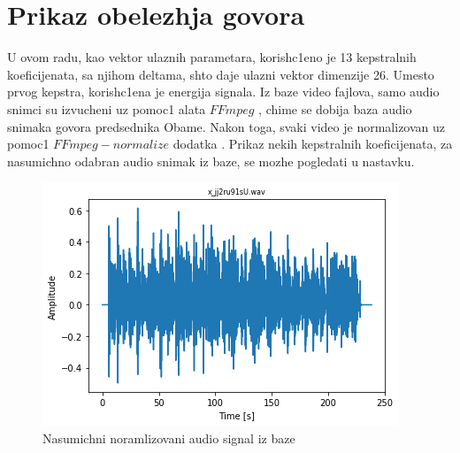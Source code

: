 \documentclass[a4paper, openany, oneside, 11pt]{book}
\begin{document}
\section{Prikaz obelezhja govora}
U ovom radu, kao vektor ulaznih parametara, korish\-c1eno je 13 kepstralnih koeficijenata, sa njihom deltama, shto daje ulazni vektor dimenzije 26. Umesto prvog kepstra, korish\-c1ena je energija signala. Iz baze video fajlova, samo audio snimci su izvucheni uz pomoc1 alata $FFmpeg$ \cite{FFmpeg}, chime se dobija baza audio snimaka govora predsednika Obame. Nakon toga, svaki video je normalizovan uz pomoc1 $FFmpeg-normalize$ dodatka \cite{FFmpegN}. Prikaz nekih kepstralnih koeficijenata, za nasumichno odabran audio snimak iz baze, se mozhe pogledati u nastavku.
\begin{figure}[h!]
\centering
  \includegraphics[scale=0.5]{res/audio_sig.png}
  \caption{Nasumichni noramlizovani audio signal iz baze}
  \label{fig:3}
  \vspace{0pt}
\end{figure}
\end{document}
